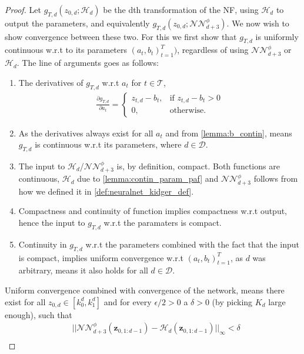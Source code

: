 \begin{proof}
    Let \(g_{T,d}(z_{0,d} ; \mathcal{H}_d)\) be the dth transformation of the NF, using \(\mathcal{H}_d\) to output the parameters, and equivalently
    \(g_{T,d}(z_{0,d} ; \mathcal{NN}_{d+3}^{\phi})\). We now wish to show convergence between these two. For this we first show that \(g_{T,d}\) is 
    uniformly continuous w.r.t to its parameters \((a_t,b_t)_{t=1}^T)\), regardless of using \(\mathcal{NN}_{d+3}^{\phi}\) or \(\mathcal{H}_d\). 
    The line of arguments goes as follows:
    \begin{enumerate}
        \item The derivatives of \(g_{T,d}\) w.r.t \(a_t\) for \(t \in \mathcal{T}\),
            \begin{align*}
                \frac{\partial g_{T,d}}{\partial a_t} =
                \begin{cases}
                    z_{t,d} - b_t, & \text{if \(z_{t,d} - b_t > 0\)}\\
                    0, & \text{otherwise}.
                \end{cases}
            \end{align*}
        \item As the derivatives always exist for all \(a_t\) and from \cref{lemma:b_contin}, means \(g_{T,d}\) is continuous w.r.t its parameters, 
            where \(d \in \mathcal{D}\).
        \item The input to \(\mathcal{H}_d\)/\(\mathcal{NN}_{d+3}^{\phi}\) is, by definition, compact. Both functions are continuous,
            \(\mathcal{H}_d\) due to \cref{lemma:contin_param_paf} and \(\mathcal{NN}_{d+3}^{\phi}\) follows from how we defined it
            in \cref{def:neuralnet_kidger_def}.
        \item Compactness and continuity of function implies compactness w.r.t output, hence the input to \(g_{T,d}\) w.r.t the paramaters is compact.
        \item Continuity in \(g_{T,d}\) w.r.t the parameters combined with the fact that the input is compact, implies uniform convergence
            w.r.t \((a_t,b_t)_{t=1}^T\), as \(d\) was arbitrary, means it also holds for all \(d \in \mathcal{D}\).
    \end{enumerate}
    Uniform convergence combined with convergence of the network, means there exist for all \(z_{0,d} \in [k_0^d, k_1^d]\) 
    and for every \(\epsilon/2 >0\) a \(\delta > 0\) (by picking \(K_d\) large enough), such that
    \begin{align*}
        &\lvert\lvert \mathcal{NN}_{d+3}^{\phi}(\bm z_{0,1:d-1}) - \mathcal{H}_d(\bm z_{0,1:d-1})\rvert\rvert_{\infty} < \delta\\

\end{align*}
\end{proof}
